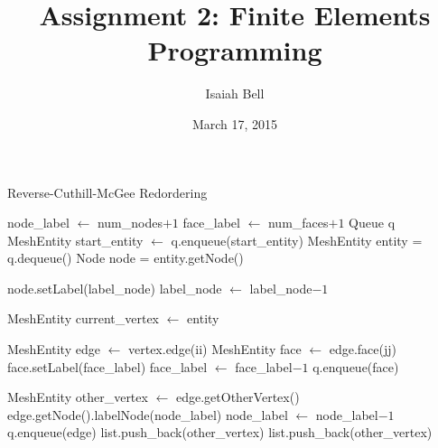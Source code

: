 \documentclass{article}
\begin{document}
\title{Assignment 2: Finite Elements Programming}
\date{March 17, 2015}   
\author{Isaiah Bell} 
\maketitle
  
\begin{algorithm}[ht]
\caption{Reverse-Cuthill-McGee Redordering}\label{RCM}
\begin{algorithmic}
    \State node\_label $\gets$ num\_nodes$ + 1$
    \State face\_label $\gets$ num\_faces$ + 1$
    \State Queue q
    \State MeshEntity start\_entity $\gets$ 
    \State q.enqueue(start\_entity)
        \State MeshEntity entity = q.dequeue()
        \State Node node = entity.getNode()

            \State node.setLabel(label\_node)
            \State label\_node $\gets$ label\_node$ - 1$
        \EndIf

            \State {}
            \State MeshEntity current\_vertex $\gets$ entity 

                MeshEntity edge $\gets$ vertex.edge(ii)
                    \State MeshEntity face $\gets$ edge.face(jj)
                        \State face.setLabel(face\_label)
                        \State face\_label $\gets$ face\_label$ - 1$
                    \EndIf
                            \State q.enqueue(face)
                        \EndIf

                    \EndIf
                \EndFor

                \State MeshEntity other\_vertex $\gets$ edge.getOtherVertex()
                        \State edge.getNode().labelNode(node\_label)
                        \State node\_label $\gets$ node\_label$ - 1$
                    \Else
                        \State q.enqueue(edge)
                        \State list.push\_back(other\_vertex)
                    \EndIf
                \Else
                        \State list.push\_back(other\_vertex)
                    \EndIf
                \EndIf
            \EndFor

\end{algorithmic}
\end{algorithm}
\end{document}
